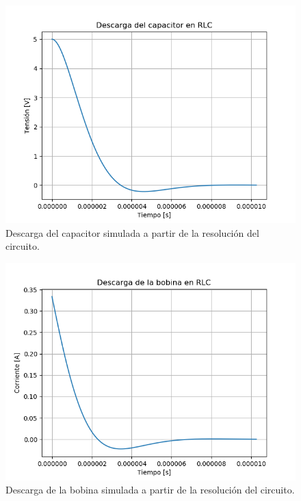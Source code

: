 \documentclass[a4paper]{article}
\begin{document}
\begin{figure}[H]
	\centering
	\includegraphics[width=\textwidth]{LTSpice-DescargaCSim}
	\caption{Descarga del capacitor simulada a partir de la resolución del circuito.}
	\label{fig:LTSDCS}
\end{figure}

\begin{figure}[H]
	\centering
	\includegraphics[width=\textwidth]{LTSpice-DescargaLSim}
	\caption{Descarga de la bobina simulada a partir de la resolución del circuito.}
	\label{fig:LTSDLS}
\end{figure}
\end{document}
